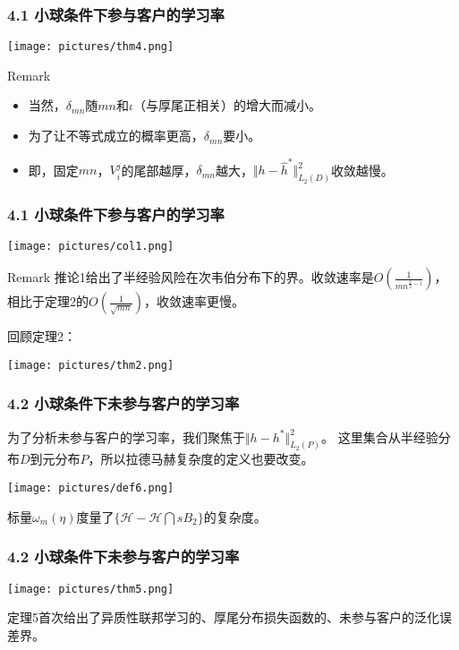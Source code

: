 \documentclass{beamer}
\begin{document}
\begin{frame}
    \frametitle{4.1 小球条件下参与客户的学习率}
    \begin{center}
        \texttt{[image: pictures/thm4.png]}
    \end{center}
    \pause
    \begin{alertblock}{Remark}
        \begin{itemize}
            \item 当然，$\delta_{mn}$随$mn$和$\iota $（与厚尾正相关）的增大而减小。
            \pause
            \item 为了让不等式成立的概率更高，$\delta_{mn}$要小。
            \pause
            \item 即，固定$mn$，$V_{i}^{j}$的尾部越厚，$\delta_{mn}$越大，$\Vert h - \hat{h}^{*} \Vert_{L_{2}(D)}^{2}$收敛越慢。
        \end{itemize}
    \end{alertblock}
\end{frame}
\begin{frame}
    \frametitle{4.1 小球条件下参与客户的学习率}
    \begin{center}
        \texttt{[image: pictures/col1.png]}
    \end{center}
    \begin{alertblock}{Remark}
        推论1给出了半经验风险在次韦伯分布下的界。收敛速率是$O(\frac{1}{mn^{\frac{1}{2} - \iota}})$，
        相比于定理2的$O(\frac{1}{\sqrt{mn}})$，收敛速率更慢。
    \end{alertblock}
    \pause
    回顾定理2：
    \begin{center}
        \texttt{[image: pictures/thm2.png]}
    \end{center}
\end{frame}

\begin{frame}
    \frametitle{4.2 小球条件下未参与客户的学习率}
    为了分析未参与客户的学习率，我们聚焦于$\Vert h - h^{*} \Vert_{L_{2}(P)}^{2}$。
    这里集合从半经验分布$D$到元分布$P$，所以拉德马赫复杂度的定义也要改变。
    \begin{center}
        \texttt{[image: pictures/def6.png]}
    \end{center}
    \pause
    标量$\omega_{m}(\eta)$度量了$\{\mathcal{H}- \mathcal{H}\bigcap sB_{2}\}$的复杂度。
\end{frame}

\begin{frame}
    \frametitle{4.2 小球条件下未参与客户的学习率}
    \begin{center}
        \texttt{[image: pictures/thm5.png]}
    \end{center}
    \pause
    定理5首次给出了异质性联邦学习的、厚尾分布损失函数的、未参与客户的泛化误差界。
\end{frame}
\end{document}
